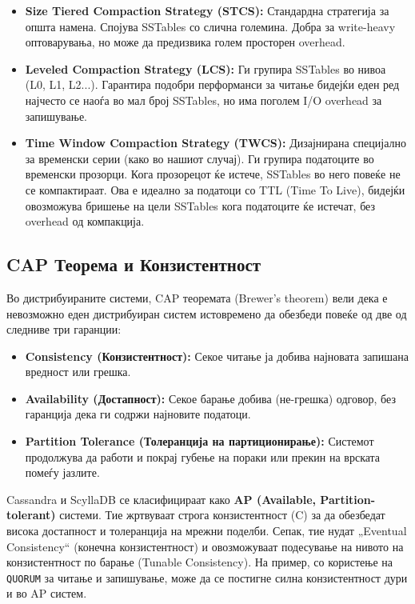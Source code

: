 \begin{itemize}
    \item \textbf{Size Tiered Compaction Strategy (STCS):} Стандардна стратегија за општа намена. Спојува 
    SSTables со слична големина. Добра за write-heavy оптоварувања, но може да предизвика голем просторен overhead.
    \item \textbf{Leveled Compaction Strategy (LCS):} Ги групира SSTables во нивоа (L0, L1, L2...). Гарантира 
    подобри перформанси за читање бидејќи еден ред најчесто се наоѓа во мал број SSTables, но има поголем 
    I/O overhead за запишување.
    \item \textbf{Time Window Compaction Strategy (TWCS):} Дизајнирана специјално за временски серии (како 
    во нашиот случај). Ги групира податоците во временски прозорци. Кога прозорецот ќе истече, SSTables во 
    него повеќе не се компактираат. Ова е идеално за податоци со TTL (Time To Live), бидејќи овозможува 
    бришење на цели SSTables кога податоците ќе истечат, без overhead од компакција.
\end{itemize}

\subsection{CAP Теорема и Конзистентност}
Во дистрибуираните системи, CAP теоремата (Brewer's theorem) вели дека е невозможно еден дистрибуиран систем 
истовремено да обезбеди повеќе од две од следниве три гаранции:
\begin{itemize}
    \item \textbf{Consistency (Конзистентност):} Секое читање ја добива најновата запишана вредност или грешка.
    \item \textbf{Availability (Достапност):} Секое барање добива (не-грешка) одговор, без гаранција дека ги 
    содржи најновите податоци.
    \item \textbf{Partition Tolerance (Толеранција на партиционирање):} Системот продолжува да работи и покрај 
    губење на пораки или прекин на врската помеѓу јазлите.
\end{itemize}

Cassandra и ScyllaDB се класифицираат како \textbf{AP (Available, Partition-tolerant)} системи. Тие жртвуваат 
строга конзистентност (C) за да обезбедат висока достапност и толеранција на мрежни поделби. Сепак, тие нудат 
„Eventual Consistency“ (конечна конзистентност) и овозможуваат подесување на нивото на конзистентност по 
барање (Tunable Consistency). На пример, со користење на \texttt{QUORUM} за читање и запишување, може да се 
постигне силна конзистентност дури и во AP систем.

